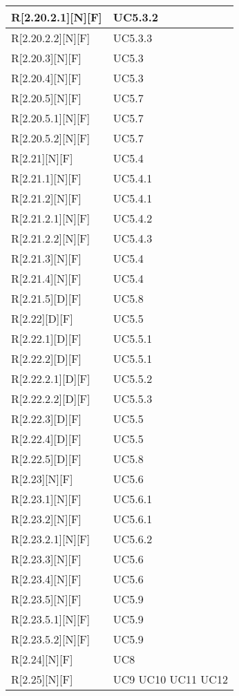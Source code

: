 \begin{longtable}{X | X}
\hline
R[2.20.2.1][N][F] & UC5.3.2 \\
\hline
R[2.20.2.2][N][F] & UC5.3.3 \\
\hline
R[2.20.3][N][F] & UC5.3 \\
\hline
R[2.20.4][N][F] & UC5.3 \\
\hline
R[2.20.5][N][F] & UC5.7 \\
\hline
R[2.20.5.1][N][F] & UC5.7 \\
\hline
R[2.20.5.2][N][F] & UC5.7 \\
\hline
R[2.21][N][F] & UC5.4 \\
\hline
R[2.21.1][N][F] & UC5.4.1 \\
\hline
R[2.21.2][N][F] & UC5.4.1 \\
\hline
R[2.21.2.1][N][F] & UC5.4.2 \\
\hline
R[2.21.2.2][N][F] & UC5.4.3 \\
\hline
R[2.21.3][N][F] & UC5.4 \\
\hline
R[2.21.4][N][F] & UC5.4 \\
\hline
R[2.21.5][D][F] & UC5.8 \\
\hline
R[2.22][D][F] & UC5.5 \\
\hline
R[2.22.1][D][F] & UC5.5.1 \\
\hline
R[2.22.2][D][F] & UC5.5.1 \\
\hline
R[2.22.2.1][D][F] & UC5.5.2 \\
\hline
R[2.22.2.2][D][F] & UC5.5.3 \\
\hline
R[2.22.3][D][F] & UC5.5 \\
\hline
R[2.22.4][D][F] & UC5.5 \\
\hline
R[2.22.5][D][F] & UC5.8 \\
\hline
R[2.23][N][F] & UC5.6 \\
\hline
R[2.23.1][N][F] & UC5.6.1 \\
\hline
R[2.23.2][N][F] & UC5.6.1 \\
\hline
R[2.23.2.1][N][F] & UC5.6.2 \\
\hline
R[2.23.3][N][F] & UC5.6 \\
\hline
R[2.23.4][N][F] & UC5.6 \\
\hline
R[2.23.5][N][F] & UC5.9 \\
\hline
R[2.23.5.1][N][F] & UC5.9 \\
\hline
R[2.23.5.2][N][F] & UC5.9 \\
\hline
R[2.24][N][F] & UC8 \\
\hline
R[2.25][N][F] & UC9 \newline UC10 \newline UC11 \newline UC12 \newline \\

\end{longtable}
